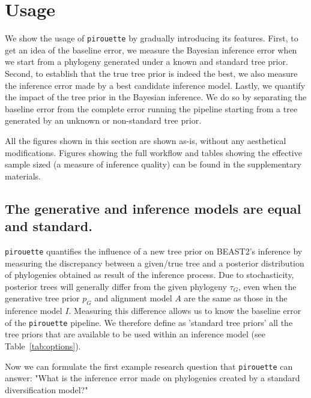 \section{Usage}

We show the usage of \verb;pirouette; by gradually introducing
its features.
First, to get an idea of the baseline error, 
we measure the Bayesian inference error when we start from a phylogeny 
generated under a known and standard tree prior.
Second, to establish that the true tree prior is indeed the best, 
we also measure the inference error made by a
best candidate inference model.
Lastly, we quantify the impact of the tree prior in the Bayesian inference. 
We do so by separating the baseline error from the complete error 
running the pipeline starting from a tree generated by an unknown 
or non-standard tree prior.

All the figures shown in this section are shown as-is, without any
aesthetical modifications. Figures showing the full workflow 
and tables showing the effective sample sized (a measure
of inference quality) can be found in the supplementary materials.

\subsection{The generative and inference models are equal and standard.}

\verb;pirouette; quantifies the influence of a new tree prior on BEAST2's 
inference by measuring the discrepancy between a given/true tree and a posterior 
distribution of phylogenies obtained as result of the inference process. 
Due to stochasticity, posterior trees will generally differ from the given 
phylogeny $\tau_{\mathit{G}}$, even when the generative tree 
prior $\mathit{p_{G}}$ and alignment model $\mathit{A}$ are the same as those 
in the inference model $\mathit{I}$.
Measuring this difference allows us to know the baseline error
of the \verb;pirouette; pipeline. We therefore define as 'standard tree priors' 
all the tree priors that are available 
to be used within an inference model (see Table~\ref{tab:options}).

Now we can formulate the first example research question that \verb;pirouette; 
can answer: "What is the inference error made on phylogenies created by a 
standard diversification model?"


